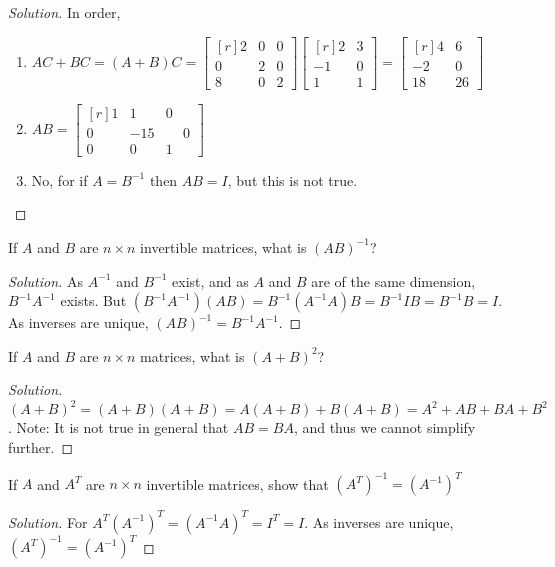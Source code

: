 \documentclass[crop=false,class=book,oneside]{standalone}
\begin{document}
\begin{proof}[Solution]
In order,
\begin{enumerate}
    \item $AC+BC = (A+B)C = \begin{bmatrix*}[r] 2 & 0 & 0 \\ 0 & 2 & 0 \\ 8 & 0 & 2 \end{bmatrix*} \begin{bmatrix*}[r] 2 & 3 \\ -1 & 0 \\ 1 & 1 \end{bmatrix*} = \begin{bmatrix*}[r] 4 & 6 \\ -2 & 0 \\ 18 & 26 \end{bmatrix*}$
    \item $AB = \begin{bmatrix*}[r] 1 & 1 & 0 \\ 0 & -15 & \phantom{-}0 \\ 0 & 0 & 1 \end{bmatrix*}$
    \item No, for if $A=B^{-1}$ then $AB=I$, but this is not true.
\end{enumerate}
\end{proof}
\begin{problem}
If $A$ and $B$ are $n\times n$ invertible matrices, what is $(AB)^{-1}$?
\end{problem}
\begin{proof}[Solution]
As $A^{-1}$ and $B^{-1}$ exist, and as $A$ and $B$ are of the same dimension, $B^{-1}A^{-1}$ exists. But $(B^{-1}A^{-1})(AB) = B^{-1}(A^{-1}A)B = B^{-1}IB = B^{-1}B = I$. As inverses are unique, $(AB)^{-1} = B^{-1}A^{-1}$.
\end{proof}
\begin{problem}
If $A$ and $B$ are $n\times n$ matrices, what is $(A+B)^2$?
\end{problem}
\begin{proof}[Solution]
$(A+B)^2 =(A+B)(A+B) = A(A+B)+B(A+B)=A^2+AB+BA+B^2$. Note: It is not true in general that $AB=BA$, and thus we cannot simplify further.
\end{proof}
\begin{problem}
If $A$ and $A^T$ are $n\times n$ invertible matrices, show that $(A^T)^{-1} = (A^{-1})^T$
\end{problem}
\begin{proof}[Solution]
For $A^T(A^{-1})^T = (A^{-1}A)^T = I^T = I$. As inverses are unique, $(A^T)^{-1} = (A^{-1})^T$
\end{proof}
\end{document}
